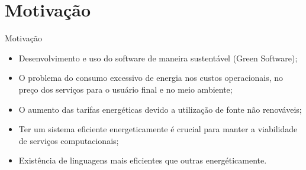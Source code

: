 \section{Motivação}

\begin{frame}{Motivação}
    \begin{itemize}
        \item Desenvolvimento e uso do software de maneira sustentável (Green Software);
        \item O problema do consumo excessivo de energia nos custos operacionais, no preço dos serviços para o usuário final e no meio ambiente;
        \item O aumento das tarifas energéticas devido a utilização de fonte não renováveis;
        \item Ter um sistema eficiente energeticamente é crucial para manter a viabilidade de serviços computacionais;
        \item Existência de linguagens mais eficientes que outras energéticamente.
    \end{itemize}
\end{frame}
